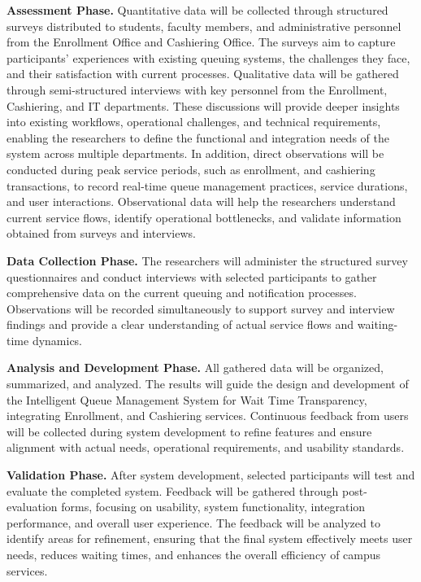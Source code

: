 \documentclass{research}
\begin{document}
\medskip
\textbf{Assessment Phase.} Quantitative data will be collected through structured surveys distributed to students, faculty members, and administrative personnel from the Enrollment Office and Cashiering Office. The surveys aim to capture participants' experiences with existing queuing systems, the challenges they face, and their satisfaction with current processes. Qualitative data will be gathered through semi-structured interviews with key personnel from the Enrollment, Cashiering, and IT departments. These discussions will provide deeper insights into existing workflows, operational challenges, and technical requirements, enabling the researchers to define the functional and integration needs of the system across multiple departments. In addition, direct observations will be conducted during peak service periods, such as enrollment, and cashiering transactions, to record real-time queue management practices, service durations, and user interactions. Observational data will help the researchers understand current service flows, identify operational bottlenecks, and validate information obtained from surveys and interviews.

\medskip
\textbf{Data Collection Phase.} The researchers will administer the structured survey questionnaires and conduct interviews with selected participants to gather comprehensive data on the current queuing and notification processes. Observations will be recorded simultaneously to support survey and interview findings and provide a clear understanding of actual service flows and waiting-time dynamics.

\medskip
\textbf{Analysis and Development Phase.} All gathered data will be organized, summarized, and analyzed. The results will guide the design and development of the Intelligent Queue Management System for Wait Time Transparency, integrating Enrollment, and Cashiering services. Continuous feedback from users will be collected during system development to refine features and ensure alignment with actual needs, operational requirements, and usability standards.

\medskip
\textbf{Validation Phase.} After system development, selected participants will test and evaluate the completed system. Feedback will be gathered through post-evaluation forms, focusing on usability, system functionality, integration performance, and overall user experience. The feedback will be analyzed to identify areas for refinement, ensuring that the final system effectively meets user needs, reduces waiting times, and enhances the overall efficiency of campus services.
\end{document}
